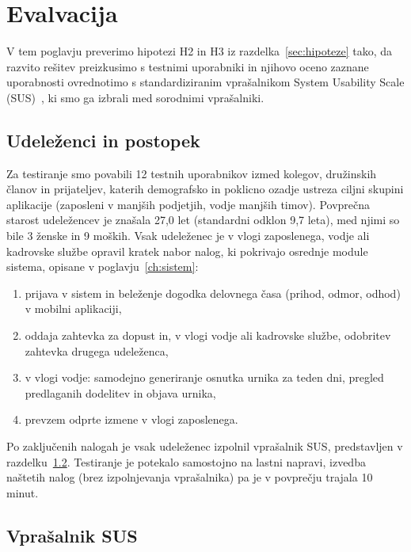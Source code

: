 \chapter{Evalvacija}
\label{ch:evalvacija}

V tem poglavju preverimo hipotezi H2 in H3 iz razdelka~\ref{sec:hipoteze} tako, da razvito rešitev preizkusimo s testnimi uporabniki in njihovo oceno zaznane uporabnosti ovrednotimo s standardiziranim vprašalnikom System Usability Scale (SUS)~\cite{brooke1996sus}, ki smo ga izbrali med sorodnimi vprašalniki.

\section{Udeleženci in postopek}
\label{sec:eval-postopek}

Za testiranje smo povabili 12 testnih uporabnikov izmed kolegov, družinskih članov in prijateljev, katerih demografsko in poklicno ozadje ustreza ciljni skupini aplikacije (zaposleni v manjših podjetjih, vodje manjših timov). Povprečna starost udeležencev je znašala 27,0 let (standardni odklon 9,7 leta), med njimi so bile 3 ženske in 9 moških. Vsak udeleženec je v vlogi zaposlenega, vodje ali kadrovske službe opravil kratek nabor nalog, ki pokrivajo osrednje module sistema, opisane v poglavju~\ref{ch:sistem}:

\begin{enumerate}
    \item prijava v sistem in beleženje dogodka delovnega časa (prihod, odmor, odhod) v mobilni aplikaciji,
    \item oddaja zahtevka za dopust in, v vlogi vodje ali kadrovske službe, odobritev zahtevka drugega udeleženca,
    \item v vlogi vodje: samodejno generiranje osnutka urnika za teden dni, pregled predlaganih dodelitev in objava urnika,
    \item prevzem odprte izmene v vlogi zaposlenega.
\end{enumerate}

Po zaključenih nalogah je vsak udeleženec izpolnil vprašalnik SUS, predstavljen v razdelku~\ref{sec:eval-sus}. Testiranje je potekalo samostojno na lastni napravi, izvedba naštetih nalog (brez izpolnjevanja vprašalnika) pa je v povprečju trajala 10 minut.

\section{Vprašalnik SUS}
\label{sec:eval-sus}

